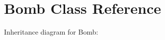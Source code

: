 \hypertarget{class_bomb}{}\section{Bomb Class Reference}
\label{class_bomb}


Inheritance diagram for Bomb\+:
